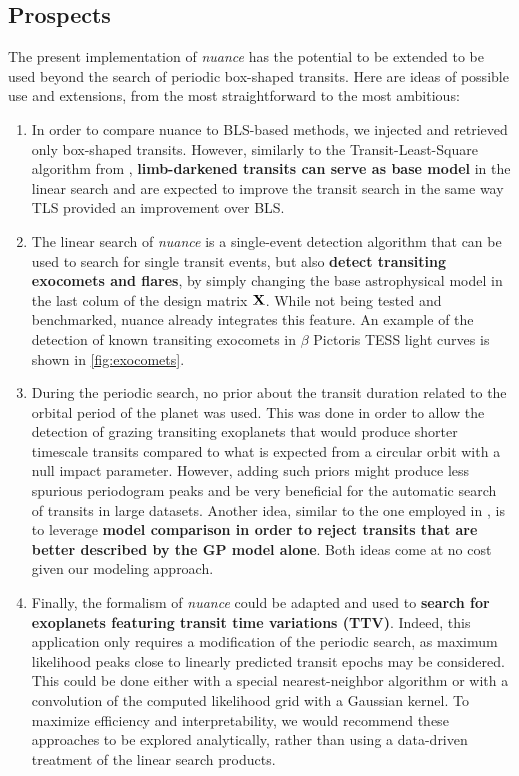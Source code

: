 \documentclass[modern]{aastex631}
\newcommand{\nuancemethod}{\textit{nuance}}
\newcommand{\nuancecode}{\textsf{nuance}}
\begin{document}
\subsection{Prospects}
The present implementation of \nuancemethod{} has the potential to be extended to be used beyond the search of periodic box-shaped transits. Here are ideas of possible use and extensions, from the most straightforward to the most ambitious:
\begin{enumerate}
    \item In order to compare \nuancecode{} to BLS-based methods, we injected and retrieved only box-shaped transits. However, similarly to the Transit-Least-Square algorithm from \cite{tls}, \textbf{limb-darkened transits can serve as base model} in the linear search and are expected to improve the transit search in the same way TLS provided an improvement over BLS.
    \item The linear search of \nuancemethod{} is a single-event detection algorithm that can be used to search for single transit events, but also \textbf{detect transiting exocomets and flares}, by simply changing the base astrophysical model in the last colum of the design matrix $\bf{X}$. While not being tested and benchmarked, \nuancecode{} already integrates this feature. An example of the detection of known transiting exocomets in $\beta$ Pictoris TESS light curves is shown in \autoref{fig:exocomets}.
    \item During the periodic search, no prior about the transit duration related to the orbital period of the planet was used. This was done in order to allow the detection of grazing transiting exoplanets that would produce shorter timescale transits compared to what is expected from a circular orbit with a null impact parameter. However, adding such priors might produce less spurious periodogram peaks and be very beneficial for the automatic search of transits in large datasets. Another idea, similar to the one employed in \cite{foreman2016}, is to leverage \textbf{model comparison in order to reject transits that are better described by the GP model alone}. Both ideas come at no cost given our modeling approach.
    \item Finally, the formalism of \nuancemethod{} could be adapted and used to \textbf{search for exoplanets featuring transit time variations (TTV)}. Indeed, this application only requires a modification of the periodic search, as maximum likelihood peaks close to linearly predicted transit epochs may be considered. This could be done either with a special nearest-neighbor algorithm or with a convolution of the computed likelihood grid with a Gaussian kernel. To maximize efficiency and interpretability, we would recommend these approaches to be explored analytically, rather than using a data-driven treatment of the linear search products.
\end{enumerate}
\end{document}
